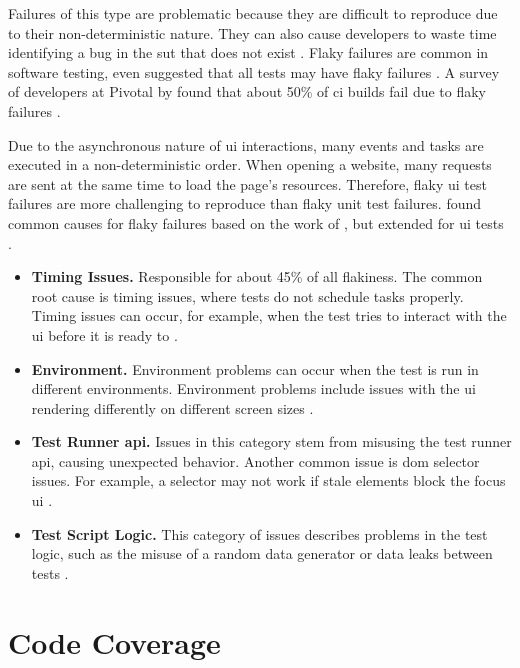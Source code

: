 Failures of this type are problematic because they are difficult to reproduce due to their non-deterministic nature.
They can also cause developers to waste time identifying a bug in the \ac{sut} that does not exist \autocite{ziftci_-flake_2020}.
Flaky failures are common in software testing, \citeauthor*{harman_start-ups_2018} even suggested that all tests may have flaky failures \autocite{harman_start-ups_2018}.
A survey of developers at Pivotal by \citeauthor*{hilton_trade-offs_2017} found that about 50\% of \ac{ci} builds fail due to flaky failures \autocite{hilton_trade-offs_2017}.

Due to the asynchronous nature of \ac{ui} interactions, many events and tasks are executed in a non-deterministic order.
When opening a website, many requests are sent at the same time to load the page's resources.
Therefore, flaky \ac{ui} test failures are more challenging to reproduce than flaky unit test failures.
 found common causes for flaky failures based on the work of \citeauthor*{luo_empirical_2014}, but extended for \ac{ui} tests \autocite{luo_empirical_2014,romano_empirical_2021}.

\begin{itemize}
	\item \textbf{Timing Issues.} Responsible for about 45\% of all flakiness. The common root cause is timing issues, where tests do not schedule tasks properly.
	      Timing issues can occur, for example, when the test tries to interact with the \ac{ui} before it is ready to \autocite{romano_empirical_2021}.
	\item \textbf{Environment.} Environment problems can occur when the test is run in different environments.
	      Environment problems include issues with the \ac{ui} rendering differently on different screen sizes \autocite{romano_empirical_2021}.
	\item \textbf{Test Runner \acs{api}.} Issues in this category stem from misusing the test runner \ac{api}, causing unexpected behavior.
	      Another common issue is \ac{dom} selector issues. For example, a selector may not work if stale elements block the focus \ac{ui} \autocite{romano_empirical_2021}.
	\item \textbf{Test Script Logic.} This category of issues describes problems in the test logic, such as the misuse of a random data generator or data leaks between tests \autocite{romano_empirical_2021}.
\end{itemize}


\section{Code Coverage}

